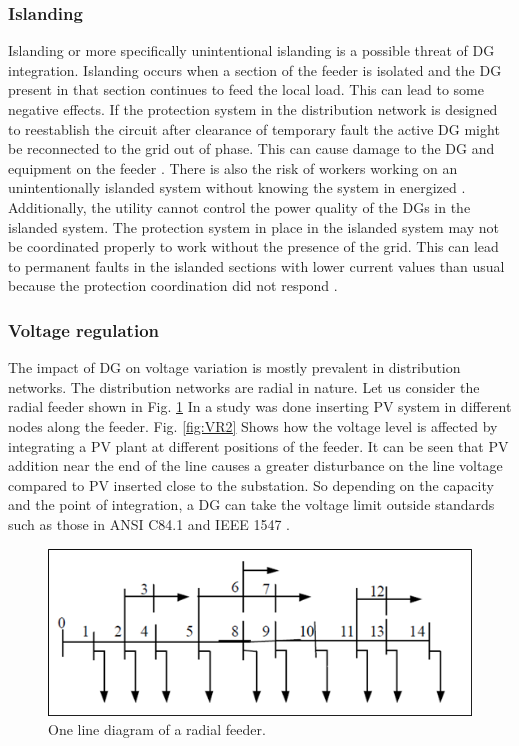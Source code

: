 \subsubsection{Islanding}
Islanding or more specifically unintentional islanding is a possible threat of DG integration. Islanding occurs when a section of the feeder is isolated and the DG present in that section continues to feed the local load. This can lead to some negative effects. If the protection system in the distribution network is designed to reestablish the circuit after clearance of temporary fault the active DG might be reconnected to the grid out of phase. This can cause damage to the DG and equipment on the feeder \cite{ILAND_1}. There is also the risk of workers working on an unintentionally islanded system without knowing the system in energized \cite{ILAND_1}. Additionally, the utility cannot control the power quality of the DGs in the islanded system. The protection system in place in the islanded system may not be coordinated properly to work without the presence of the grid. This can lead to permanent faults in the islanded sections with lower current values than usual because the protection coordination did not respond \cite{ILAND_2}.

\subsubsection{Voltage regulation}
The impact of DG on voltage variation is mostly prevalent in distribution networks. The distribution networks are radial in nature. Let us consider the radial feeder shown in 
Fig. \ref{fig:VR1} In \cite{VR1} a study was done inserting PV system in different nodes along the feeder. Fig. \ref{fig:VR2} Shows how the voltage level is affected by integrating a PV plant at different positions of the feeder. It can be seen that PV addition near the end of the line causes a greater disturbance on the line voltage compared to PV inserted close to the substation. So depending on the capacity and the point of integration, a DG can take the voltage limit outside standards such as those in ANSI C84.1 and IEEE 1547 \cite{VR2}. 

\begin{figure}[!h]
\centering
\includegraphics[width=0.85\linewidth]{figs/VR1.png}
\caption[One line diagram of a radial feeder]{One line diagram of a radial feeder.\cite{VR1}}
\label{fig:VR1}
\end{figure}

